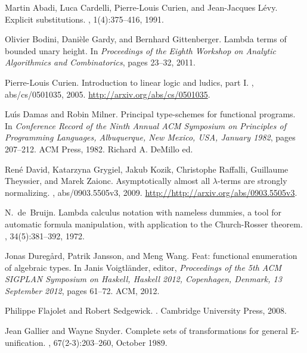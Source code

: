 \documentclass{jfp1}
\begin{document}
\begin{thebibliography}{10}

Martin Abadi, Luca Cardelli, Pierre-Louis Curien, and Jean-Jacques L{\'e}vy.
\newblock Explicit substitutions.
, 1(4):375--416, 1991.

Olivier Bodini, Dani\`ele Gardy, and Bernhard Gittenberger.
\newblock Lambda terms of bounded unary height.
\newblock In {\em Proceedings of the Eighth Workshop on Analytic Algorithmics
  and Combinatorics}, pages 23--32, 2011.

Pierre-Louis Curien.
\newblock Introduction to linear logic and ludics, part {I}.
, abs/cs/0501035, 2005.
\newblock \url{http://arxiv.org/abs/cs/0501035}.

Lu\'{\i}s Damas and Robin Milner.
\newblock Principal type-schemes for functional programs.
\newblock In {\em Conference Record of the Ninth Annual {ACM} {Symposium on
  Principles of Programming Languages}, Albuquerque, New Mexico, USA, January
  1982}, pages 207--212. ACM Press, 1982.
\newblock Richard A. DeMillo ed.

Ren{\'e} David, Katarzyna Grygiel, Jakub Kozik, Christophe Raffalli, Guillaume
  Theyssier, and Marek Zaionc.
\newblock Asymptotically almost all $\lambda$-terms are strongly normalizing.
, abs/0903.5505v3, 2009.
\newblock \url{http://http://arxiv.org/abs/0903.5505v3}.

N.~de~Bruijn.
\newblock Lambda calculus notation with nameless dummies, a tool for automatic
  formula manipulation, with application to the {Church-Rosser} theorem.
, 34(5):381--392, 1972.

Jonas Dureg{\aa}rd, Patrik Jansson, and Meng Wang.
\newblock Feat: functional enumeration of algebraic types.
\newblock In Janis Voigtl{\"a}nder, editor, {\em Proceedings of the 5th {ACM
  SIGPLAN} {Symposium on Haskell, Haskell} 2012, {Copenhagen, Denmark}, 13
  {September} 2012}, pages 61--72. ACM, 2012.

Philippe Flajolet and Robert Sedgewick.
.
\newblock Cambridge University Press, 2008.

Jean Gallier and Wayne Snyder.
\newblock Complete sets of transformations for general {E}-unification.
, 67(2-3):203--260, October 1989.


\end{thebibliography}
\end{document}
